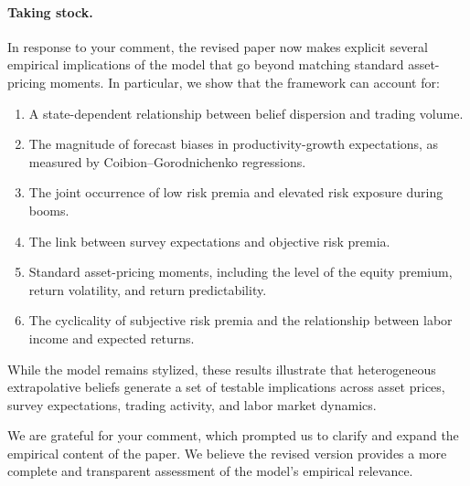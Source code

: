 \documentclass[12pt,a4paper]{article}
\newcommand{\commentbox}[1]{
\begin{mdframed}[style=commentbox] 
		\textit{#1}
\end{mdframed}}
\begin{document}
\paragraph{Taking stock.}

In response to your comment, the revised paper now makes explicit several empirical implications of the model that go beyond matching standard asset-pricing moments. In particular, we show that the framework can account for:

\begin{enumerate}
    \item A state-dependent relationship between belief dispersion and trading volume.
    \item The magnitude of forecast biases in productivity-growth expectations, as measured by Coibion--Gorodnichenko regressions.
    \item The joint occurrence of low risk premia and elevated risk exposure during booms.
    \item The link between survey expectations and objective risk premia.
    \item Standard asset-pricing moments, including the level of the equity premium, return volatility, and return predictability.
    \item The cyclicality of subjective risk premia and the relationship between labor income and expected returns.
\end{enumerate}

While the model remains stylized, these results illustrate that heterogeneous extrapolative beliefs generate a set of testable implications across asset prices, survey expectations, trading activity, and labor market dynamics.

We are grateful for your comment, which prompted us to clarify and expand the empirical content of the paper. We believe the revised version provides a more complete and transparent assessment of the model's empirical relevance.


\end{document}
